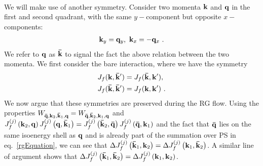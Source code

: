\documentclass[%
reprint,
superscriptaddress,
groupedaddress,
superscriptaddress,
onecolumn,
10pt
]{revtex4-2}
\begin{document}
\par{}\\
We will make use of another symmetry. Consider two momenta \({\bf k}\) and \({\bf q}\) in the first and second quadrant, with the same \(y-\)component but opposite \(x-\)components:
\begin{equation}\begin{aligned}
	{\bf k}_y = {\bf q}_y, ~ {\bf k}_x = -{\bf q}_x~.
\end{aligned}\end{equation}
We refer to \({\bf q}\) as \({\bf \bar k}\) to signal the fact the above relation between the two momenta. We first consider the bare interaction, where we have the symmetry
\begin{equation}\begin{aligned}\label{adjacent}
	J_f({\bf k}, {\bf \bar k}^\prime) = J_f({\bf \bar k}, {\bf k}^\prime),~\\
	J_f({\bf \bar k}, {\bf \bar k}^\prime) = J_f({\bf k}, {\bf k}^\prime)~.
\end{aligned}\end{equation}
We now argue that these symmetries are preserved during the RG flow. Using the properties \(W_{{\bf \bar q}, {\bf k}_2, {\bf \bar k}_1, {\bf q}} = W_{{\bf \bar q}, {\bf \bar k}_2, {\bf k}_1, {\bf q}}\) and  \(J_f^{(j)}\left({\bf k}_2,{\bf q}\right) J_f^{(j)}\left({\bf q},{\bf \bar k}_1\right) = J_f^{(j)}\left({\bf \bar k}_2,{\bf \bar q}\right) J_f^{(j)}\left({\bf \bar q},{\bf k}_1\right)\) and the fact that \({\bf \bar q}\) lies on the same isoenergy shell as \({\bf q}\) and is already part of the summation over PS in eq.~\ref{rgEquation}, we can see that \(\Delta J_f^{(j)}\left({\bf \bar k}_1, {\bf k}_2\right) = \Delta J_f^{(j)}\left({\bf k}_1, {\bf \bar k}_2\right)\). A similar line of argument shows that \(\Delta J_f^{(j)}\left({\bf \bar k}_1, {\bf \bar k}_2\right) = \Delta J_f^{(j)}\left({\bf k}_1, {\bf k}_2\right)\).
\end{document}
